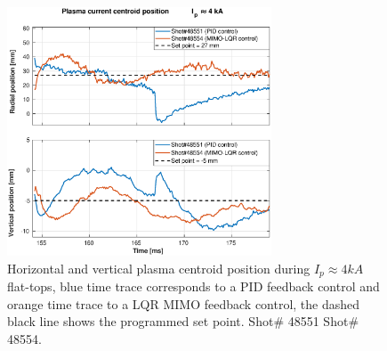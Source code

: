 \begin{figure}
	\centering
	\includegraphics[width=0.7\textwidth]{Chp5/PIDvsMIMO_551_554_2.eps}
	\caption{ Horizontal and vertical plasma centroid position during  $I_p\approx 4kA$  flat-tops, blue time trace corresponds to a PID feedback control and orange time trace to a LQR MIMO feedback control, the dashed black line shows the programmed set point. Shot$\#$ 48551 Shot$\#$ 48554. }
\end{figure}


